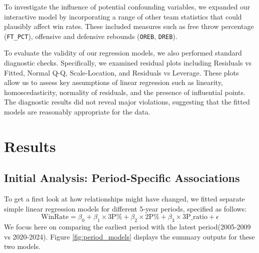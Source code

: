\documentclass[11pt, a4paper]{article} %
\begin{document}

To investigate the influence of potential confounding variables, we expanded our interactive model by incorporating a range of 
other team statistics that could plausibly affect win rates. These included measures such as free throw percentage 
(\texttt{FT\_PCT}), offensive and defensive rebounds (\texttt{OREB}, \texttt{DREB}).

To evaluate the validity of our regression models, we also performed standard diagnostic checks. Specifically, we examined 
residual plots including Residuals vs Fitted, Normal Q-Q, Scale-Location, and Residuals vs Leverage. These plots allow us to 
assess key assumptions of linear regression such as linearity, homoscedasticity, normality of residuals, and the presence of 
influential points. The diagnostic results did not reveal major violations, suggesting that the fitted models are reasonably 
appropriate for the data.



\section{Results}
\subsection{Initial Analysis: Period-Specific Associations}

To get a first look at how relationships might have changed, we fitted separate simple linear regression models for 
different 5-year periods, specified as follows:
\begin{equation*}
\text{WinRate} = \beta_0 + \beta_1 \times \text{3P\%} + \beta_2 \times \text{2P\%} + \beta_3 \times \text{3P\_ratio} + \epsilon
\end{equation*}
We focus here on comparing the earliest period with the latest period(2005-2009 vs 2020-2024). Figure \ref{fig:period_models} displays the summary outputs 
for these two models.
\end{document}
